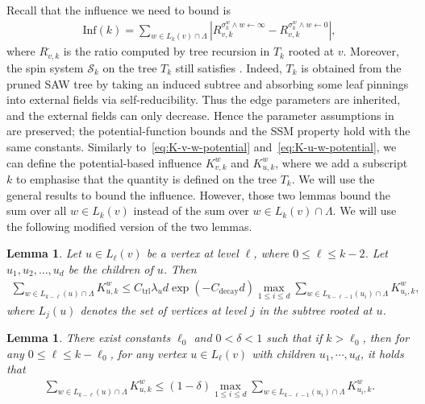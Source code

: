 \documentclass[11pt]{amsart}
\newcommand{\tp}[1]{{\left( #1 \right)}}
\def\+#1{\mathcal{#1}}
\newcommand{\abs}[1]{\ensuremath{\left\vert#1\right\vert}}
\newtheorem{lemma}[theorem]{Lemma}
\theoremstyle{definition}
\theoremstyle{remark}
\begin{document}
Recall that the influence we need to bound is 
\begin{align*}
    \text{Inf}(k) = \sum_{w \in L_k(v) \cap \Lambda} \abs{R_{v,k}^{\sigma^w_k \land w \gets \infty}-R_{v,k}^{\sigma^w_k \land w \gets 0}},
\end{align*}
where $R_{v,k}^{\cdot}$ is the ratio computed by tree recursion in $T_k$ rooted at $v$. 
Moreover, the spin system $\+S_k$ on the tree $T_k$ still satisfies . Indeed, $T_k$ is obtained from the pruned SAW tree by taking an induced subtree and absorbing some leaf pinnings into external fields via self-reducibility. Thus the edge parameters are inherited, and the external fields can only decrease. Hence the parameter assumptions in  are preserved; the potential-function bounds and the SSM property hold with the same constants.
Similarly to~\eqref{eq:K-v-w-potential} and~\eqref{eq:K-u-w-potential}, we can define the potential-based influence $K_{v,k}^w$ and $K_{u,k}^w$, where we add a subscript $k$ to emphasise that the quantity is defined on the tree $T_k$.
We will use the general results  to bound the influence. However, those two lemmas bound the sum over all $w \in L_k(v)$ instead of the sum over $w \in L_k(v) \cap \Lambda$. We will use the following modified version of the two lemmas.

\begin{lemma}\label{lemma:general-influence-decay-1-modi}
    Let $u \in L_\ell(v)$ be a vertex at level $\ell$, where $0 \le \ell \leq k-2$. Let $u_1,u_2,\ldots,u_d$ be the children of $u$. Then
\begin{align*}
\sum_{w \in L_{k-\ell}(u) \cap \Lambda} K_{u,k}^w %
 \leq C_\text{trl} \lambda_u d \exp(-C_{\text{decay}}d)\max_{1 \leq i \leq d} \sum_{w \in L_{k-\ell-1}(u_i) \cap \Lambda} K_{u_i,k}^w,
\end{align*}
where $L_j(u)$ denotes the set of vertices at level $j$ in the subtree rooted at $u$.
\end{lemma}

\begin{lemma}\label{lemma:general-influence-decay-2-modi}
There exist constants $\ell_0$ and $0< \delta < 1$ such that if $k > \ell_0$, then for any $0 \leq \ell \leq k - \ell_0$, for any vertex $u \in L_\ell(v)$ with children $u_1,\cdots,u_d$, it holds that 
\begin{align*}
  \sum_{w \in L_{k-\ell}(u) \cap \Lambda} K_{u,k}^{w} \leq (1 - \delta) \max_{1 \leq i \leq d} \sum_{w \in L_{k-\ell-1}(u_i) \cap \Lambda} K_{u_i,k}^w.
\end{align*}
\end{lemma}
\end{document}
